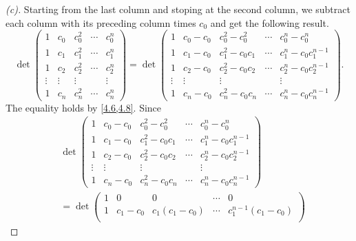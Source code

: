 \begin{proof}[(c)]
  Starting from the last column and stoping at the second column, we subtract each column with its preceding column times \(c_0\) and get the following result.
  \[
    \det\begin{pmatrix}
      1      & c_0    & c_0^2  & \cdots & c_0^n  \\
      1      & c_1    & c_1^2  & \cdots & c_1^n  \\
      1      & c_2    & c_2^2  & \cdots & c_2^n  \\
      \vdots & \vdots & \vdots &        & \vdots \\
      1      & c_n    & c_n^2  & \cdots & c_n^n
    \end{pmatrix} = \det\begin{pmatrix}
      1      & c_0 - c_0 & c_0^2 - c_0^2   & \cdots & c_0^n - c_0^n           \\
      1      & c_1 - c_0 & c_1^2 - c_0 c_1 & \cdots & c_1^n - c_0 c_1^{n - 1} \\
      1      & c_2 - c_0 & c_2^2 - c_0 c_2 & \cdots & c_2^n - c_0 c_2^{n - 1} \\
      \vdots & \vdots    & \vdots          &        & \vdots                  \\
      1      & c_n - c_0 & c_n^2 - c_0 c_n & \cdots & c_n^n - c_0 c_n^{n - 1}
    \end{pmatrix}.
  \]
  The equality holds by \cref{4.6,4.8}.
  Since
  \begin{align*}
     & \det\begin{pmatrix}
             1      & c_0 - c_0 & c_0^2 - c_0^2   & \cdots & c_0^n - c_0^n           \\
             1      & c_1 - c_0 & c_1^2 - c_0 c_1 & \cdots & c_1^n - c_0 c_1^{n - 1} \\
             1      & c_2 - c_0 & c_2^2 - c_0 c_2 & \cdots & c_2^n - c_0 c_2^{n - 1} \\
             \vdots & \vdots    & \vdots          &        & \vdots                  \\
             1      & c_n - c_0 & c_n^2 - c_0 c_n & \cdots & c_n^n - c_0 c_n^{n - 1}
           \end{pmatrix}                           \\
     & = \det\begin{pmatrix}
               1      & 0         & 0               & \cdots & 0                       \\
               1      & c_1 - c_0 & c_1 (c_1 - c_0) & \cdots & c_1^{n - 1} (c_1 - c_0) \\

\end{pmatrix}
\end{align*}
\end{proof}

